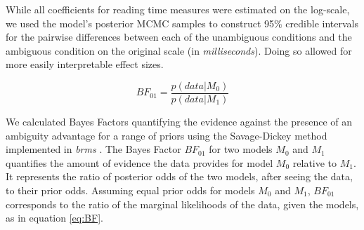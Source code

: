 \documentclass[english, doc]{apa7}\usepackage[]{graphicx}\usepackage[]{color}
\begin{document}
While all coefficients for reading time measures were estimated on the log-scale, we used the model's posterior MCMC samples to construct 95\% credible intervals for the pairwise differences between each of the unambiguous conditions and the ambiguous condition on the original scale (in \emph{milliseconds}). Doing so allowed for more easily interpretable effect sizes.



{%
\begin{equation}
    BF_{01} = \frac{p(data|M_0)}{p(data|M_1)}
    \label{eq:BF}
\end{equation}
}

We calculated Bayes Factors quantifying the evidence against the presence of an ambiguity advantage for a range of priors \citep[e.g.,][]{LeeWagenmakers:2014} using the Savage-Dickey method implemented in \emph{brms} \citep{R-brms_a}. The Bayes Factor $BF_{01}$ for two models $M_0$ and $M_1$ quantifies the amount of evidence the data provides for model $M_0$ relative to $M_1$. It represents the ratio of posterior odds of the two models, after seeing the data, to their prior odds. Assuming equal prior odds for models $M_0$ and $M_1$, $BF_{01}$ corresponds to the ratio of the marginal likelihoods of the data, given the models, as in equation \ref{eq:BF}.
\end{document}
